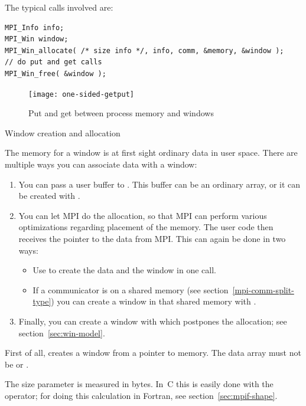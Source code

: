 The typical calls involved are:
\lstset{style=reviewcode,language=C}
\begin{lstlisting}
MPI_Info info;
MPI_Win window;
MPI_Win_allocate( /* size info */, info, comm, &memory, &window );
// do put and get calls
MPI_Win_free( &window );
\end{lstlisting}

\begin{figure}[ht]
  \texttt{[image: one-sided-getput]}
  \caption{Put and get between process memory and windows}
  \label{fig:putget}
\end{figure}

 {Window creation and allocation}
\label{sec:win-alloc}

The memory for a window is at first sight ordinary data in user space. There are multiple
ways you can associate data with a window:
\begin{enumerate}
\item You can pass a user buffer to
  . This buffer can be an ordinary array,
  or it can be created with .
\item You can let MPI do the allocation, so that MPI can perform various
  optimizations regarding placement of the memory. The user code then
  receives the pointer to the data from MPI. This can again be done in two ways:
  \begin{itemize}
  \item Use  to create the data and the
    window in one call.
  \item If a communicator is on a shared memory (see
    section~\ref{mpi-comm-split-type}) you can create a window in that
    shared memory with .
  \end{itemize}
\item Finally, you can create a window with
   which postpones the allocation;
  see section~\ref{sec:win-model}.
\end{enumerate}

First of all, 
creates a window from a pointer to memory.
The data array must not be  or .

The size parameter is measured in bytes. In~C this is easily done
with the  operator;
for doing this calculation in Fortran, see section~\ref{sec:mpif-shape}.

